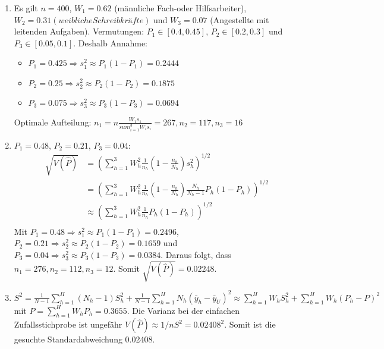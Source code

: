 \documentclass{article}
\begin{document}
\begin{solution}
\begin{enumerate}
	\item Es gilt $n=400$, $W_1 = 0.62$ (männliche Fach-oder Hilfsarbeiter), $W_2=0.31 (weibliche Schreibkräfte)$ und $W_3 = 0.07$ (Angestellte mit leitenden Aufgaben). Vermutungen: $P_1 \in [0.4,0.45]$, $P_2 \in [0.2,0.3]$ und $P_3 \in [0.05,0.1]$. Deshalb Annahme:
	\begin{itemize}
		\item $P_1 = 0.425 \Rightarrow s_1^2 \approx P_1(1-P_1) = 0.2444$
		\item $P_2 = 0.25 \Rightarrow s_2^2 \approx P_2(1-P_2) = 0.1875$
		\item $P_3 = 0.075 \Rightarrow s_3^2 \approx P_3(1-P_3) = 0.0694$
	\end{itemize}
	Optimale Aufteilung: $n_1 = n \frac{W_1 s_1}{sum_{i=1}^3 W_i s_i}=267, n_2 = 117, n_3 = 16$
	\item $P_1=0.48$, $P_2=0.21$, $P_3=0.04$:
	\begin{align*}
	\sqrt{V(\hat{P})} &= \left(\sum_{h=1}^3W_h^2\frac{1}{n_h}\left(1-\frac{n_h}{N_h}\right)s_h^2\right)^{1/2}\\
	&= \left(\sum_{h=1}^3W_h^2\frac{1}{n_h}\left(1-\frac{n_h}{N_h}\right)\frac{N_h}{N_h-1}P_h(1-P_h)\right)^{1/2}\\
	&\approx \left(\sum_{h=1}^3W_h^2\frac{1}{n_h} P_h(1-P_h)\right)^{1/2}\\
	\end{align*}
	Mit $P_1 = 0.48 \Rightarrow s_1^2 \approx P_1(1-P_1)=0.2496$, $P_2 = 0.21 \Rightarrow s_2^2 \approx P_2(1-P_2)=0.1659$ und $P_3 = 0.04 \Rightarrow s_3^2 \approx P_3(1-P_3)=0.0384$. Daraus folgt, dass $n_1=276,n_2=112,n_3=12$. Somit $\sqrt{V(\hat{P})} = 0.02248$.
	\item $S^2 = \frac{1}{N-1}\sum_{h=1}^H(N_h-1)S_h^2 + \frac{1}{N-1}\sum_{h=1}^H N_h(\bar{y}_h - \bar{y}_U)^2 \approx \sum_{h=1}^H W_h S_h^2 + \sum_{h=1}^H W_h(P_h-P)^2$ mit $P=\sum_{h=1}^H W_h P_h=0.3655$. Die Varianz bei der einfachen Zufallsstichprobe ist ungefähr $V(\hat{P}) \approx 1/n S^2 = 0.02408^2$. Somit ist die gesuchte Standardabweichung 0.02408.

\end{enumerate}
\end{solution}
\end{document}
